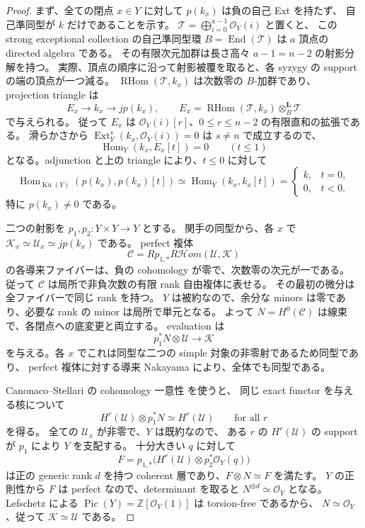 \begin{proof}
まず、全ての閉点 $x\in Y$ に対して $p(k_x)$ は負の自己 Ext を持たず、
自己準同型が $k$ だけであることを示す。
$\mathcal T=\bigoplus_{i=0}^{a-1}\mathcal O_Y(i)$ と置くと、
この strong exceptional collection の自己準同型環
$B=\operatorname{End}(\mathcal T)$ は $a$ 頂点の directed algebra である。
その有限次元加群は長さ高々 $a-1=n-2$ の射影分解を持つ。
実際、頂点の順序に沿って射影被覆を取ると、各 syzygy の support の端の頂点が一つ減る。
$\operatorname{RHom}(\mathcal T,k_x)$ は次数零の $B$-加群であり、
projection triangle は
\[
 E_x\longrightarrow k_x\longrightarrow jp(k_x),\qquad
 E_x=\operatorname{RHom}(\mathcal T,k_x)\otimes_B^{\mathbf L}\mathcal T
\]
で与えられる。
従って $E_x$ は $\mathcal O_Y(i)[r]$、$0\le r\le n-2$ の有限直和の拡張である。
滑らかさから
$\operatorname{Ext}^s_Y(k_x,\mathcal O_Y(i))=0$ は $s\ne n$ で成立するので、
\[
 \operatorname{Hom}_Y(k_x,E_x[t])=0\qquad(t\le1)
\]
となる。adjunction と上の triangle により、$t\le0$ に対して
\[
 \operatorname{Hom}_{\operatorname{Ku}(Y)}(p(k_x),p(k_x)[t])
   \simeq\operatorname{Hom}_Y(k_x,k_x[t])
   =\begin{cases}k,&t=0,\\0,&t<0.\end{cases}
\]
特に $p(k_x)\ne0$ である。

二つの射影を $p_1,p_2:Y\times Y\to Y$ とする。
関手の同型から、各 $x$ で
$\mathcal K_x\simeq\mathcal U_x\simeq jp(k_x)$ である。
perfect 複体
\[
 \mathcal C=Rp_{1,*}R\mathcal Hom(\mathcal U,\mathcal K)
\]
の各導来ファイバーは、負の cohomology が零で、次数零の次元が一である。
従って $\mathcal C$ は局所で非負次数の有限 rank 自由複体に表せる。
その最初の微分は全ファイバーで同じ rank を持つ。
$Y$ は被約なので、余分な minors は零であり、必要な rank の minor は局所で単元となる。
よって $N=H^0(\mathcal C)$ は線束で、各閉点への底変更と両立する。
evaluation は
\[
 p_1^*N\otimes\mathcal U\longrightarrow\mathcal K
\]
を与える。各 $x$ でこれは同型な二つの simple 対象の非零射であるため同型であり、
perfect 複体に対する導来 Nakayama により、全体でも同型である。

Canonaco--Stellari の cohomology 一意性
\cite[Corollary~4.4]{NFMCanonacoStellariKernels}を使うと、
同じ exact functor を与える核について
\[
 H^r(\mathcal U)\otimes p_1^*N\simeq H^r(\mathcal U)
 \qquad\text{for all }r
\]
を得る。
全ての $\mathcal U_x$ が非零で、$Y$ は既約なので、
ある $r$ の $H^r(\mathcal U)$ の support が $p_1$ により $Y$ を支配する。
十分大きい $q$ に対して
\[
 F=p_{1,*}\bigl(H^r(\mathcal U)\otimes p_2^*\mathcal O_Y(q)\bigr)
\]
は正の generic rank $d$ を持つ coherent 層であり、$F\otimes N\simeq F$ を満たす。
$Y$ の正則性から $F$ は perfect なので、determinant を取ると $N^{\otimes d}\simeq\mathcal O_Y$ となる。
Lefschetz による $\operatorname{Pic}(Y)=\mathbb Z[\mathcal O_Y(1)]$ は torsion-free であるから、
$N\simeq\mathcal O_Y$、従って $\mathcal K\simeq\mathcal U$ である。


\end{proof}
